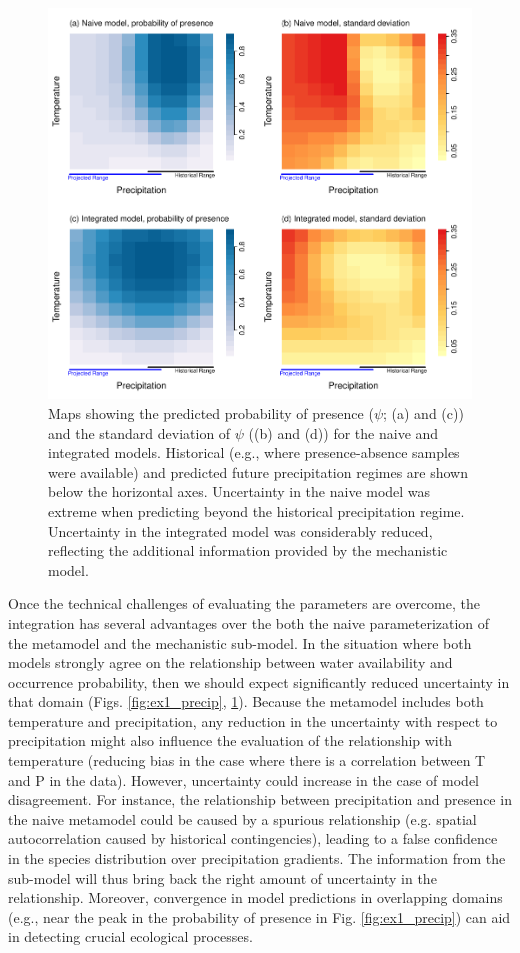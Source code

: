 \begin{figure}[tb]
	\includegraphics[width=5.25in]{ex1_map.pdf}
	\caption{Maps showing the predicted probability of presence (\(\psi\); (a) and (c)) and the standard deviation of \(\psi\) ((b) and (d)) for the naive and integrated models.
	Historical (e.g., where presence-absence samples were available) and predicted future precipitation regimes are shown below the horizontal axes.
	Uncertainty in the naive model was extreme when predicting beyond the historical precipitation regime.
	Uncertainty in the integrated model was considerably reduced, reflecting the additional information provided by the mechanistic model.}
	\label{fig:ex1_map}
\end{figure}
%

Once the technical challenges of evaluating the parameters are overcome, the integration has several advantages over the both the naive parameterization of the metamodel and the mechanistic sub-model. 
In the situation where both models strongly agree on the relationship between water availability and occurrence probability, then we should expect significantly reduced uncertainty in that domain (Figs. \ref{fig:ex1_precip}, \ref{fig:ex1_map}).
Because the metamodel includes both temperature and precipitation, any reduction in the uncertainty with respect to precipitation might also influence the evaluation of the relationship with temperature (reducing bias in the case where there is a correlation between T and P in the data). 
However, uncertainty could increase in the case of model disagreement.
For instance, the relationship between precipitation and presence in the naive metamodel could be caused by a spurious relationship (e.g. spatial autocorrelation caused by historical contingencies), leading to a false confidence in the species distribution over precipitation gradients. 
The information from the sub-model will thus bring back the right amount of uncertainty in the relationship.
Moreover, convergence in model predictions in overlapping domains (e.g., near the peak in the probability of presence in Fig. \ref{fig:ex1_precip}) can aid in detecting crucial ecological processes.

